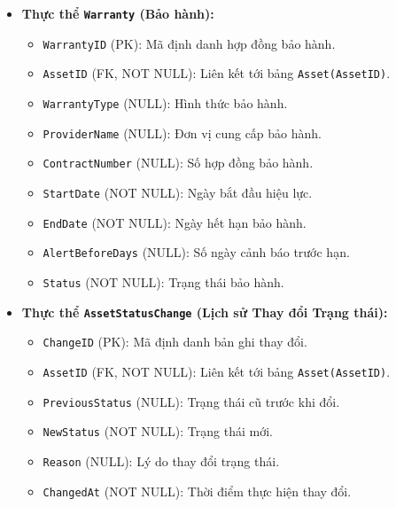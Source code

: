 \begin{itemize}[leftmargin=2em]
\begin{itemize}
    \end{itemize}
    \item \textbf{Thực thể \texttt{Warranty} (Bảo hành):}
    \begin{itemize}
        \item \texttt{WarrantyID} (PK): Mã định danh hợp đồng bảo hành.
        \item \texttt{AssetID} (FK, NOT NULL): Liên kết tới bảng \texttt{Asset(AssetID)}.
        \item \texttt{WarrantyType} (NULL): Hình thức bảo hành.
        \item \texttt{ProviderName} (NULL): Đơn vị cung cấp bảo hành.
        \item \texttt{ContractNumber} (NULL): Số hợp đồng bảo hành.
        \item \texttt{StartDate} (NOT NULL): Ngày bắt đầu hiệu lực.
        \item \texttt{EndDate} (NOT NULL): Ngày hết hạn bảo hành.
        \item \texttt{AlertBeforeDays} (NULL): Số ngày cảnh báo trước hạn.
        \item \texttt{Status} (NOT NULL): Trạng thái bảo hành.
    \end{itemize}
    \item \textbf{Thực thể \texttt{AssetStatusChange} (Lịch sử Thay đổi Trạng thái):}
    \begin{itemize}
        \item \texttt{ChangeID} (PK): Mã định danh bản ghi thay đổi.
        \item \texttt{AssetID} (FK, NOT NULL): Liên kết tới bảng \texttt{Asset(AssetID)}.
        \item \texttt{PreviousStatus} (NULL): Trạng thái cũ trước khi đổi.
        \item \texttt{NewStatus} (NOT NULL): Trạng thái mới.
        \item \texttt{Reason} (NULL): Lý do thay đổi trạng thái.
        \item \texttt{ChangedAt} (NOT NULL): Thời điểm thực hiện thay đổi.
    \end{itemize}
\end{itemize}

